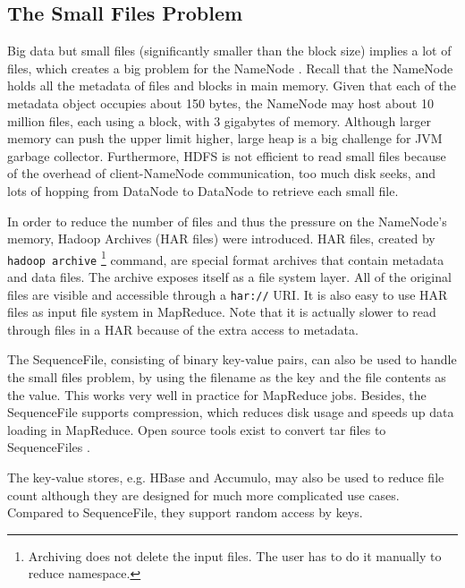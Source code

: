 \documentclass[12pt]{book}
\begin{document}
\subsection{The Small Files Problem}
Big data but small files (significantly smaller than the block size) implies a lot of files, which creates a big problem for the NameNode \cite{SmallFiles}. Recall that the NameNode holds all the metadata of files and blocks in main memory. Given that each of the metadata object occupies about 150 bytes, the NameNode may host about 10 million files, each using a block, with 3 gigabytes of memory. Although larger memory can push the upper limit higher, large heap is a big challenge for JVM garbage collector.
Furthermore, HDFS is not efficient to read small files because of the overhead of client-NameNode communication, too much disk seeks, and lots of hopping from DataNode to DataNode to retrieve each small file.

In order to reduce the number of files and thus the pressure on the NameNode's memory, Hadoop Archives (HAR files) were introduced. HAR files, created by \texttt{hadoop archive} \footnote{Archiving does not delete the input files. The user has to do it manually to reduce namespace.} command, are special format archives that contain metadata and data files. The archive exposes itself as a file system layer. All of the original files are visible and accessible through a \texttt{har://} URI. It is also easy to use HAR files as input file system in MapReduce. Note that it is actually slower to read through files in a HAR because of the extra access to metadata.

The SequenceFile, consisting of binary key-value pairs, can also be used to handle the small files problem, by using the filename as the key and the file contents as the value. This works very well in practice for MapReduce jobs. Besides, the SequenceFile supports compression, which reduces disk usage and speeds up data loading in MapReduce. Open source tools exist to convert tar files to SequenceFiles \cite {Tar2Seq}.

The key-value stores, e.g. HBase and Accumulo, may also be used to reduce file count although they are designed for much more complicated use cases. Compared to SequenceFile, they support random access by keys.
\end{document}
